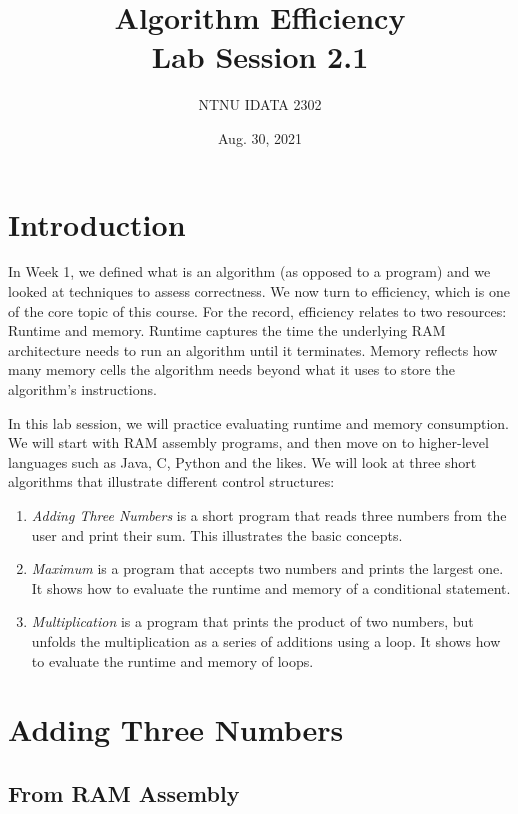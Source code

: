 \documentclass[11pt]{article}
\author{NTNU IDATA 2302}
\date{Aug. 30, 2021}
\title{Algorithm Efficiency\\\medskip
\large Lab Session 2.1}
\begin{document}
\maketitle
\tableofcontents


\section{Introduction}
\label{sec:org268a817}

In Week 1, we defined what is an algorithm (as opposed to a program)
and we looked at techniques to assess correctness. We now turn to
efficiency, which is one of the core topic of this course. For
the record, efficiency relates to two resources: Runtime and
memory. Runtime captures the time the underlying RAM architecture needs to
run an algorithm until it terminates. Memory reflects how many memory
cells the algorithm needs beyond what it uses to store the
algorithm's instructions.

In this lab session, we will practice evaluating runtime and memory
consumption. We will start with RAM assembly programs, and then move
on to higher-level languages such as Java, C, Python and the likes. We
will look at three short algorithms that illustrate different control
structures:

\begin{enumerate}
\item \emph{Adding Three Numbers} is a short program that reads three
numbers from the user and print their sum. This illustrates the
basic concepts.
\item \emph{Maximum} is a program that accepts two numbers and prints the
largest one. It shows how to evaluate the runtime and memory of a
conditional statement.
\item \emph{Multiplication} is a program that prints the product of two numbers,
but unfolds the multiplication as a series of additions using a
loop. It shows how to evaluate the runtime and memory of loops.
\end{enumerate}

\section{Adding Three Numbers}
\label{sec:orgd3a0041}

\subsection{From RAM Assembly}
\label{sec:orgfa42d15}
\end{document}
